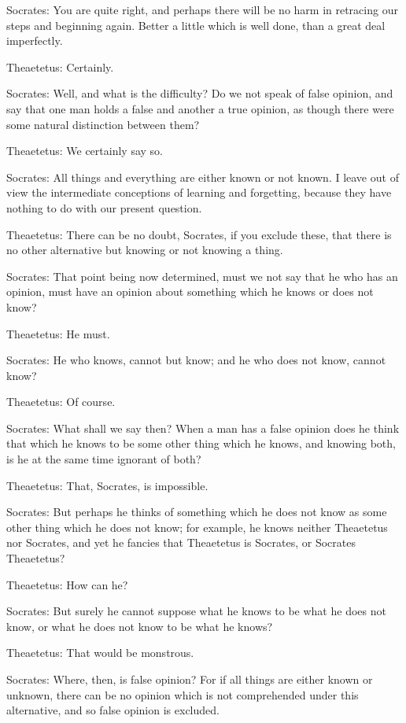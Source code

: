 Socrates: You are quite right, and perhaps there will be no harm in
retracing our steps and beginning again. Better a little which is well
done, than a great deal imperfectly.

Theaetetus: Certainly.

Socrates: Well, and what is the difficulty? Do we not speak of false
opinion, and say that one man holds a false and another a true opinion,
as though there were some natural distinction between them?

Theaetetus: We certainly say so.

Socrates: All things and everything are either known or not known.
I leave out of view the intermediate conceptions of learning and
forgetting, because they have nothing to do with our present question.

Theaetetus: There can be no doubt, Socrates, if you exclude these, that
there is no other alternative but knowing or not knowing a thing.

Socrates: That point being now determined, must we not say that he who
has an opinion, must have an opinion about something which he knows or
does not know?

Theaetetus: He must.

Socrates: He who knows, cannot but know; and he who does not know,
cannot know?

Theaetetus: Of course.

Socrates: What shall we say then? When a man has a false opinion does
he think that which he knows to be some other thing which he knows, and
knowing both, is he at the same time ignorant of both?

Theaetetus: That, Socrates, is impossible.

Socrates: But perhaps he thinks of something which he does not know as
some other thing which he does not know; for example, he knows neither
Theaetetus nor Socrates, and yet he fancies that Theaetetus is Socrates,
or Socrates Theaetetus?

Theaetetus: How can he?

Socrates: But surely he cannot suppose what he knows to be what he does
not know, or what he does not know to be what he knows?

Theaetetus: That would be monstrous.

Socrates: Where, then, is false opinion? For if all things are either
known or unknown, there can be no opinion which is not comprehended
under this alternative, and so false opinion is excluded.

